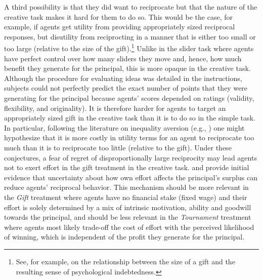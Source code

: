 A third possibility is that they did want to reciprocate but that the nature of the 
creative task makes it hard for them to do so.
This would be the case, for example, if agents get utility from providing 
appropriately sized reciprocal responses, but disutility 
from reciprocting in a manner that is either too small or too large (relative to the size of the gift).\footnote{See, for example, \cite{dorsch94} on the 
relationship between the size of a gift and the resulting sense of psychological indebtedness.} 
Unlike in the slider task where agents have perfect control over 
how many sliders they move and, hence, how much 
benefit they generate for the principal, this is more opaque in the creative task. 
Although the procedure for evaluating  ideas 
was detailed in the instructions, subjects could not perfectly 
predict the exact number of points that they were generating for the principal 
because agents' scores depended on ratings (validity, flexibility, and originality). 
It is therefore harder 
for agents to target an appropriately sized gift in the creative task than it is to do so in the simple task. 
In particular, following the literature on inequality aversion (e.g., \citealp{Fehr1999}) one might hypothesize that 
it is more costly in utility terms for  an agent to reciprocate too much than it is to
reciprocate too little (relative to the gift). Under these conjectures, a  
fear of regret of disproportionally large reciprocity may lead agents not to exert effort in the gift treatment 
in the creative task. 
\cite{Hennig2010} and \cite{Englmaier10WP} provide initial  
evidence that uncertainty about how own effort affects the principal's surplus 
can reduce agents' reciprocal 
behavior. 
This mechanism should be more relevant in the \textit{Gift} treatment 
where agents have no financial stake (fixed wage) and their effort is solely determined by 
a mix of intrinsic motivation, ability and goodwill towards the principal, and
should be less relevant in the \textit{Tournament} treatment where agents most 
likely trade-off the cost of effort with the perceived likelihood of winning, 
which is independent of the profit they generate for the principal.  

